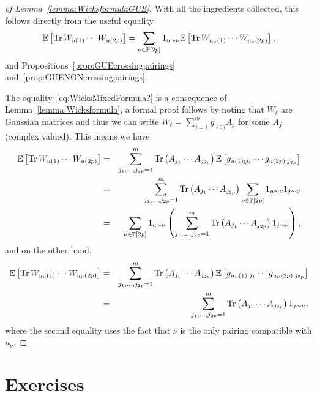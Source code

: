 \begin{proof}[of Lemma~\ref{lemma:WicksformulaGUE}]

With all the ingredients collected, this follows directly from the useful equality
\begin{equation}\label{eq:WicksMixedFormula?}
    \mathbb{E}\left[\operatorname{Tr} W_{u(1)}\cdots W_{u(2p)}\right] = \sum_{\nu\in\mathbb{P}[2p]} 1_{u \sim \nu} \mathbb{E}\left[\operatorname{Tr} W_{u_{\nu}(1)}\cdots W_{u_{\nu}(2p)}\right],
\end{equation}
and Propositions~\ref{prop:GUEcrossingpairings} and~\ref{prop:GUENONcrossingpairings}. 

The equality~\eqref{eq:WicksMixedFormula?} is a consequence of Lemma~\ref{lemma:Wicksformula}, a formal proof follows by noting that $W_{\ell}$ are Gaussian matrices and thus we can write $W_{\ell} = \sum_{j=1}^m g_{\ell;j} A_j$ for some $A_j$ (complex valued). This means we have
\begin{eqnarray*}
    \EE\left[\tr W_{u(1)}\cdots W_{u(2p)}\right] 
    &=& \sum_{j_1,\dots,j_{2p}=1}^{m} \tr\left(A_{j_1}%
    \cdots A_{j_{2p}}\right) \EE\left[ g_{u(1);j_1}%
    \cdots g_{u(2p);j_{2p}} \right]\\
    &=&  \sum_{j_1,\dots,j_{2p}=1}^{m} \tr\left(A_{j_1}%
    \cdots A_{j_{2p}}\right) \sum_{\nu\in\PP[2p]} 1_{u \sim \nu} 1_{j \sim \nu} \\
    &=& \sum_{\nu\in\PP[2p]} 1_{u \sim \nu} \left( \sum_{j_1,\dots,j_{2p}=1}^{m} \tr\left(A_{j_1}%
    \cdots A_{j_{2p}}\right)   1_{j \sim \nu} \right),
\end{eqnarray*}
and on the other hand,
\begin{eqnarray*}
    \EE\left[\tr W_{u_{\nu}(1)}\cdots W_{u_{\nu}(2p)}\right] 
    &=& \sum_{j_1,\dots,j_{2p}=1}^{m} \tr\left(A_{j_1}%
    \cdots A_{j_{2p}}\right) \EE\left[ g_{u_{\nu}(1);j_1}%
    \cdots g_{u_{\nu}(2p);j_{2p}} \right]\\
    &=&  \sum_{j_1,\dots,j_{2p}=1}^{m} \tr\left(A_{j_1}%
    \cdots A_{j_{2p}}\right) 1_{j \sim \nu},
\end{eqnarray*}
where the second equality uses the fact that $\nu$ is the only pairing compatible with $u_\nu$.
\end{proof}







\section*{Exercises}


